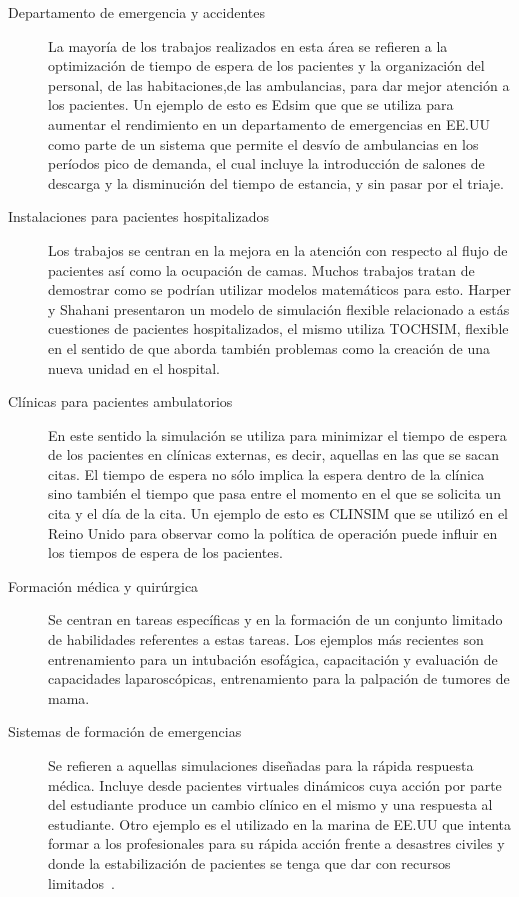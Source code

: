 \begin{description}

\item[Departamento de emergencia y accidentes] La mayoría de los trabajos
	realizados en esta área se refieren a la optimización de tiempo de
	espera de los pacientes y la organización del personal, de las
	habitaciones,de las ambulancias, para dar mejor atención a los
	pacientes. Un ejemplo de esto es Edsim que que se utiliza para aumentar
	el rendimiento en un departamento de emergencias en EE.UU como parte de
	un sistema que permite el desvío de ambulancias en los períodos pico de
	demanda, el cual incluye la introducción de salones de descarga y la
	disminución del tiempo de estancia, y sin pasar por el
	triaje\cite{guna:simulation}. 
	
\item[Instalaciones para pacientes hospitalizados] Los trabajos se centran en la
	mejora en la atención con respecto al flujo de pacientes así como la
	ocupación de camas. Muchos trabajos tratan de demostrar como se podrían
	utilizar modelos matemáticos para esto. Harper y Shahani presentaron un
	modelo de simulación flexible relacionado a estás cuestiones de
	pacientes hospitalizados, el mismo utiliza TOCHSIM, flexible en el
	sentido de que aborda también problemas como la creación de una nueva
	unidad en el hospital\cite{guna:simulation}.

\item[Clínicas para pacientes ambulatorios] En este sentido la simulación se
	utiliza para minimizar el tiempo de espera de los pacientes en clínicas
	externas, es decir, aquellas en las que se sacan citas. El tiempo de
	espera no sólo implica la espera dentro de la clínica sino también el
	tiempo que pasa entre el momento en el que se solicita un cita y el día
	de la cita. Un ejemplo de esto es CLINSIM que se utilizó en el Reino
	Unido para observar como la política de operación puede influir en los
	tiempos de espera de los pacientes\cite{guna:simulation}. 

\item[Formación médica y quirúrgica] Se centran en tareas específicas y en la
	formación de un conjunto limitado de habilidades referentes a estas
	tareas. Los ejemplos más recientes son entrenamiento para un intubación
	esofágica, capacitación y evaluación de capacidades laparoscópicas,
	entrenamiento para la palpación de tumores de mama\cite{mantovani:vr}. 

\item[Sistemas de formación de emergencias] Se refieren a aquellas simulaciones
	diseñadas para la rápida respuesta médica. Incluye desde pacientes
	virtuales dinámicos cuya acción por parte del estudiante produce un
	cambio clínico en el mismo y una respuesta al estudiante.  Otro ejemplo
	es el utilizado en la marina de EE.UU que intenta formar a los
	profesionales para su rápida acción frente a desastres civiles y donde
	la estabilización de pacientes se tenga que dar con recursos
	limitados~\cite{mantovani:vr}. 


\end{description}
